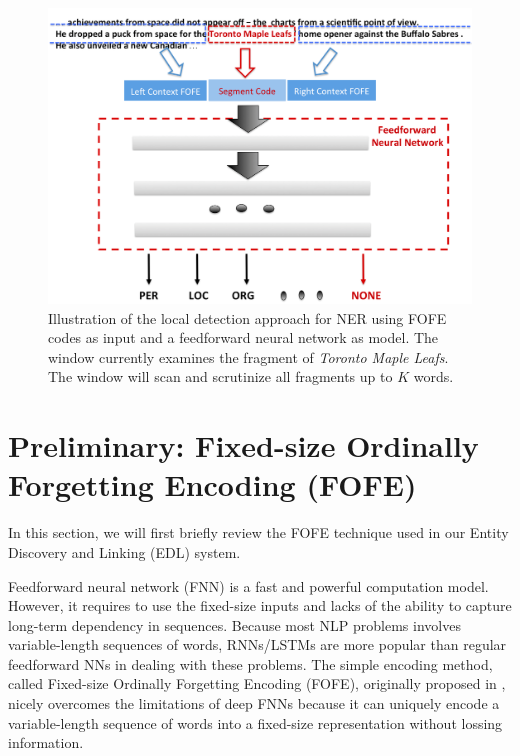 \documentclass[11pt]{article}
\begin{document}
\begin{figure}[t]
\centering
\includegraphics[width=0.75\linewidth]{Figure-Diagram.png}
\caption{Illustration of the local detection approach for NER using FOFE codes as input and a feedforward neural network as model. The window currently examines the fragment of {\it Toronto Maple Leafs}. The window will scan and scrutinize all fragments up to $K$ words. }
\label{Fig:FOFE-NER-diagram}
\end{figure}

\section{Preliminary: Fixed-size Ordinally Forgetting Encoding (FOFE) }

In this section, we will first briefly review the FOFE technique used in our Entity Discovery and Linking (EDL) system.

Feedforward neural network (FNN) is a fast and powerful computation model. 
However, it requires to use the fixed-size inputs and 
lacks of the ability to capture long-term dependency in sequences. 
Because most NLP problems involves variable-length sequences of words, 
RNNs/LSTMs are more popular than regular feedforward NNs in dealing with these problems. 
The simple encoding method, called Fixed-size Ordinally Forgetting Encoding (FOFE), 
originally proposed in \cite{zhang2015fixed}, nicely overcomes the limitations of deep FNNs because it 
can uniquely encode a variable-length sequence of words into a fixed-size representation without lossing information. 
\end{document}

